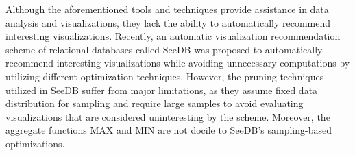 Although the aforementioned tools and techniques provide assistance in data analysis and visualizations, they lack the ability to automatically recommend interesting visualizations.
%
Recently, an automatic visualization recommendation scheme of relational databases called SeeDB \cite{DBLP:journals/pvldb/VartakMPP14,DBLP:conf/icml/BubeckWV13} was proposed to automatically recommend interesting visualizations while avoiding unnecessary computations by utilizing different optimization techniques. 
%
However, the pruning techniques utilized in SeeDB suffer from major limitations, as they assume fixed data distribution \cite{DBLP:journals/pvldb/VartakMPP14,vartakseedb} for sampling and require large samples to avoid evaluating visualizations that are considered uninteresting by the scheme.
%
%
Moreover, the aggregate functions MAX and MIN are not docile to SeeDB's sampling-based optimizations.
%
%
%
